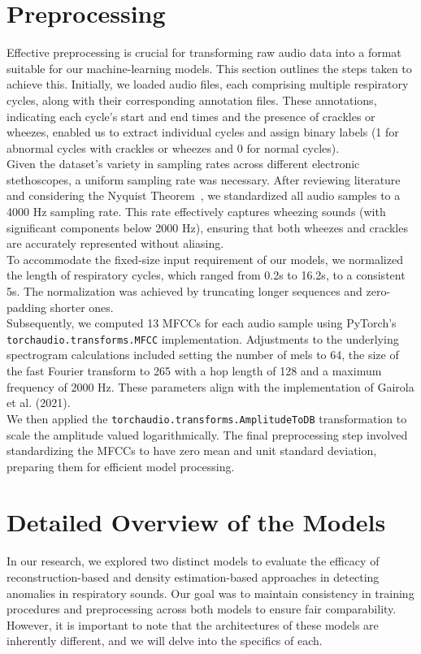 \section{Preprocessing}
Effective preprocessing is crucial for transforming raw audio data into a format suitable for our machine-learning models. This section outlines the steps taken to achieve this.
Initially, we loaded audio files, each comprising multiple respiratory cycles, along with their corresponding annotation files. These annotations, indicating each cycle's start and end times and the presence of crackles or wheezes, enabled us to extract individual cycles and assign binary labels (1 for abnormal cycles with crackles or wheezes and 0 for normal cycles).\\
Given the dataset's variety in sampling rates across different electronic stethoscopes, a uniform sampling rate was necessary. After reviewing literature~\cite{cozzatti2022variational,serbes2018automated} and considering the Nyquist Theorem~\cite{por2019nyquist}, we standardized all audio samples to a 4000 Hz sampling rate. This rate effectively captures wheezing sounds (with significant components below 2000 Hz), ensuring that both wheezes and crackles are accurately represented without aliasing.\\
To accommodate the fixed-size input requirement of our models, we normalized the length of respiratory cycles, which ranged from 0.2s to 16.2s, to a consistent 5s. The normalization was achieved by truncating longer sequences and zero-padding shorter ones.\\
Subsequently, we computed 13 MFCCs for each audio sample using PyTorch's~\cite{paszke2019pytorch} \lstinline{torchaudio.transforms.MFCC} implementation. Adjustments to the underlying spectrogram calculations included setting the number of mels to 64, the size of the fast Fourier transform to 265 with a hop length of 128 and a maximum frequency of 2000 Hz. These parameters align with the implementation of Gairola et al. (2021).\\
We then applied the \lstinline{torchaudio.transforms.AmplitudeToDB} transformation to scale the amplitude valued logarithmically. The final preprocessing step involved standardizing the MFCCs to have zero mean and unit standard deviation, preparing them for efficient model processing.


\section{Detailed Overview of the Models}
In our research, we explored two distinct models to evaluate the efficacy of reconstruction-based and density estimation-based approaches in detecting anomalies in respiratory sounds. Our goal was to maintain consistency in training procedures and preprocessing across both models to ensure fair comparability. However, it is important to note that the architectures of these models are inherently different, and we will delve into the specifics of each.

